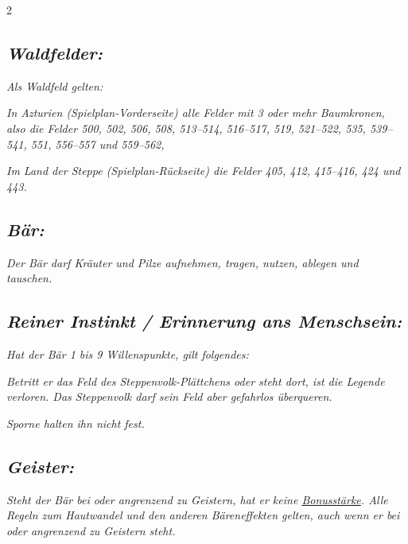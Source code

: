 \documentclass[10pt, a4paper, oneside]{book}
\newcommand{\fan}[1]{\textit{#1}}
\begin{document}
\begin{multicols*}{2}
\begin{bgcolor}
\subsection{\fan{Waldfelder:}}

\fan{Als Waldfeld gelten:}

\bullet{} \fan{In Azturien (Spielplan-Vorderseite) alle Felder mit 3 oder mehr Baumkronen, also die Felder 500, 502, 506, 508, 513–514, 516–517, 519, 521–522, 535, 539–541, 551, 556–557 und 559–562,}

\bullet{} \fan{Im Land der Steppe (Spielplan-Rückseite) die Felder 405, 412, 415–416, 424 und 443.}


\subsection{\fan{Bär:}}

\fan{Der Bär darf Kräuter und Pilze aufnehmen, tragen, nutzen, ablegen und tauschen.}



\subsection{\fan{Reiner Instinkt / Erinnerung ans Menschsein:}}

\fan{Hat der Bär 1 bis 9 Willenspunkte, gilt folgendes:}

\bullet{} \fan{Betritt er das Feld des Steppenvolk-Plättchens oder steht dort, ist die Legende verloren. Das Steppenvolk darf sein Feld aber gefahrlos überqueren.}

\bullet{} \fan{Sporne halten ihn nicht fest.}


\subsection{\fan{Geister:}}

\fan{Steht der Bär bei oder angrenzend zu Geistern, hat er keine \hyperref[bonusstaerke]{Bonusstärke}. Alle Regeln zum Hautwandel und den anderen Bäreneffekten gelten, auch wenn er bei oder angrenzend zu Geistern steht.}

\end{bgcolor}







\end{multicols*}
\end{document}
